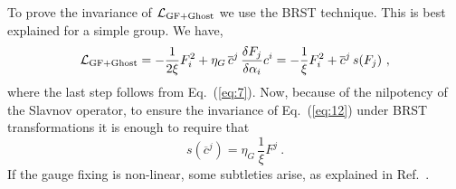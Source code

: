 \documentclass{ws-ijmpa}
\begin{document}
To prove the invariance of $\mathcal{L}_{\rm GF + Ghost}$ we use the
BRST technique. This is best explained for a simple group. We have,
%
\begin{equation}
  \label{eq:12}
  \mathcal{L}_{\rm GF + Ghost} = -\frac{1}{2\xi} F_i^2
+ \eta_G\, \overline{c}^j\,
  \frac{\delta F_j}{\delta \alpha_i} c^i =
-\frac{1}{\xi} F_i^2 + \overline{c}^j\,
  s(F_j) \ ,
\end{equation}
% 
where the last step follows from Eq.~(\ref{eq:7}). Now, because of the
nilpotency of the Slavnov operator, to ensure the
invariance of Eq.~(\ref{eq:12}) under BRST transformations it is
enough to require that
%
\begin{equation}
  \label{eq:13}
  s(\overline{c}^j) = \eta_G\, \frac{1}{\xi} F^j\ .
\end{equation}
%
If the gauge fixing is non-linear,
some subtleties arise,
as explained in Ref.~.
\end{document}
